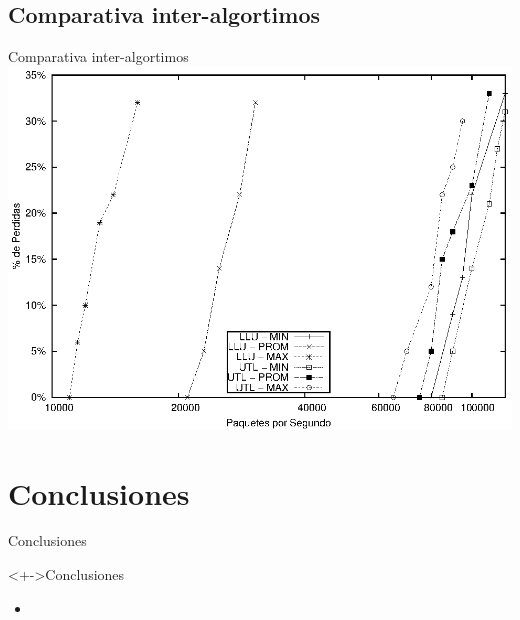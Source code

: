 \documentclass[xcolor=dvipsnames]{beamer}
\begin{document}
\subsection{Comparativa inter-algortimos}
\begin{frame}{Comparativa inter-algortimos} 
\center	
\includegraphics[scale=0.70]{figures/lluvsutl.eps} 
\end{frame}

\section{Conclusiones}
\begin{frame}{Conclusiones} 
\begin{block}<+->{Conclusiones}   
    \begin{itemize}
      \scriptsize
     	\item     	
    \end{itemize}
  \end{block}
\end{frame}
\end{document}
